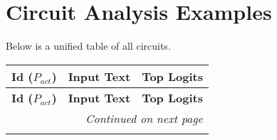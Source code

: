 \documentclass{article}
\begin{document}
\section*{Circuit Analysis Examples}

\noindent Below is a unified table of all circuits.

\small
\begin{longtable}{|p{}|p{}|p{}|}
\hline
\textbf{Id ($P_{act}$)} & \textbf{Input Text} & \textbf{Top Logits} \\
\hline
\endfirsthead  %
\hline
\textbf{Id ($P_{act}$)} & \textbf{Input Text} & \textbf{Top Logits} \\
\hline
\endhead

\hline
\multicolumn{3}{r}{\textit{Continued on next page}} \\
\hline
\endfoot


\end{longtable}
\end{document}

